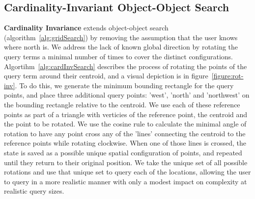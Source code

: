 \subsection{Cardinality-Invariant Object-Object Search}
\textbf{Cardinality Invariance} extends object-object search (algorithm~\ref{alg:gridSearch}) by removing the assumption that the user knows where north is. 
We address the lack of known global direction by rotating the query terms a minimal number of times to cover the distinct configurations. 
Algortihm~\ref{alg:cardInvSearch} describes the process of rotating the points of the query term around their centroid, and a visual depiction is in figure~\ref{figure:rot-inv}.
To do this, we generate the minimum bounding rectangle for the query points, and place three additional query points: 'west', 'north' and 'northwest' on the bounding rectangle relative to the centroid. 
We use each of these reference points as part of a triangle with verticies of the reference point, the centroid and the point to be rotated. 
We use the cosine rule to calculate the minimal angle of rotation to have any point cross any of the 'lines' connecting the centroid to the reference points while rotating clockwise. 
When one of those lines is crossed, the state is saved as a possible unique spatial configuration of points, and repeated until they return to their original position. 
We take the unique set of all possible rotations and use that unique set to query each of the locations, allowing the user to query in a more realistic manner with only a modest impact on complexity at realistic query sizes. 

